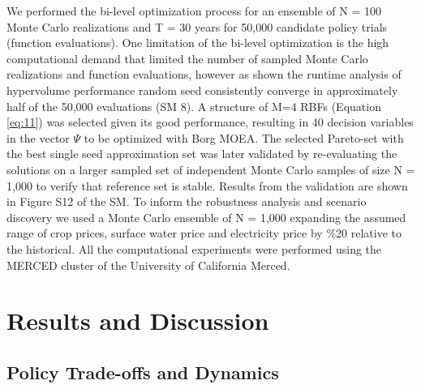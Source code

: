\documentclass[a4paper,fleqn]{cas-sc}
\begin{document}
We performed the bi-level optimization process for an ensemble of N = 100 Monte Carlo realizations and T = 30 years for 50,000 candidate policy trials (function evaluations). One limitation of the bi-level optimization is the high computational demand that limited the number of sampled Monte Carlo realizations and function evaluations, however as shown the runtime analysis of hypervolume performance random seed consistently converge in approximately half of the 50,000 evaluations (SM 8). A structure of M=4 RBFs (Equation \ref{eq:11}) was selected given its good performance, resulting in 40 decision variables in the vector $\Psi$ to be optimized with Borg MOEA. The selected Pareto-set with the best single seed approximation set was later validated by re-evaluating the solutions on a larger sampled set of independent Monte Carlo samples of size N = 1,000 to verify that reference set is stable. Results from the validation are shown in Figure S12 of the SM. To inform the robustness analysis and scenario discovery we used a Monte Carlo ensemble of N = 1,000 expanding the assumed range of crop prices, surface water price and electricity price by \%20 relative to the historical. All the computational experiments were performed using the MERCED cluster of the University of California Merced. 

\section{Results and Discussion}

\subsection{Policy Trade-offs and Dynamics}\label{sct:5.1}
\end{document}
